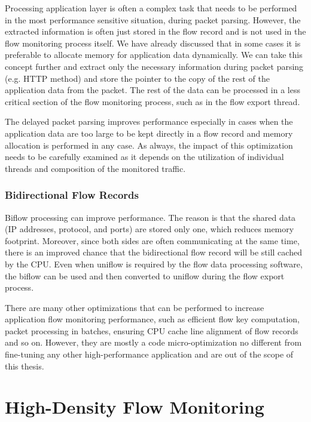 Processing application layer is often a complex task that needs to be performed in the most performance sensitive situation, during packet parsing. However, the extracted information is often just stored in the flow record and is not used in the flow monitoring process itself. We have already discussed that in some cases it is preferable to allocate memory for application data dynamically. We can take this concept further and extract only the necessary information during packet parsing (e.g. HTTP method) and store the pointer to the copy of the rest of the application data from the packet. The rest of the data can be processed in a less critical section of the flow monitoring process, such as in the flow export thread. 

The delayed packet parsing improves performance especially in cases when the application data are too large to be kept directly in a flow record and memory allocation is performed in any case. As always, the impact of this optimization needs to be carefully examined as it depends on the utilization of individual threads and composition of the monitored traffic.

\subsubsection{Bidirectional Flow Records}

Biflow processing can improve performance. The reason is that the shared data (IP addresses, protocol, and ports) are stored only one, which reduces memory footprint. Moreover, since both sides are often communicating at the same time, there is an improved chance that the bidirectional flow record will be still cached by the CPU. Even when uniflow is required by the flow data processing software, the biflow can be used and then converted to uniflow during the flow export process.


There are many other optimizations that can be performed to increase application flow monitoring performance, such as efficient flow key computation, packet processing in batches, ensuring CPU cache line alignment of flow records and so on. However, they are mostly a code micro-optimization no different from fine-tuning any other high-performance application and are out of the scope of this thesis.


\section{High-Density Flow Monitoring}\label{sec:performance-high-density}

